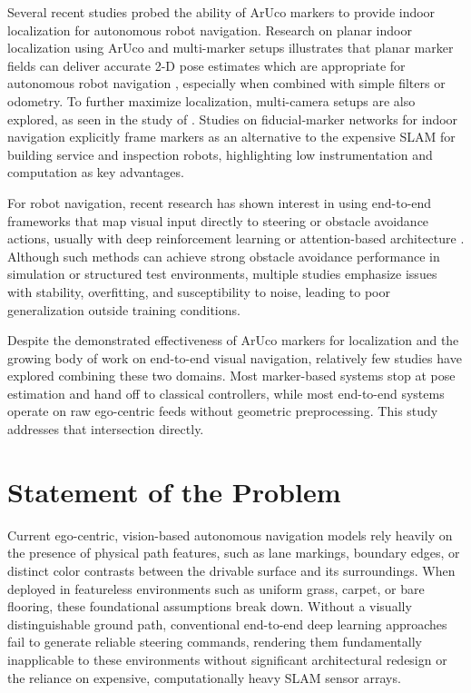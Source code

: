 Several recent studies probed the ability of ArUco markers to provide indoor localization for autonomous robot navigation. Research on planar indoor localization using ArUco \cite{Hinderer2025ArucoPlacementIndoor} and multi-marker setups illustrates that planar marker fields can deliver accurate 2-D pose estimates which are appropriate for autonomous robot navigation \cite{Lin2023MarkerBasedLocalization}, especially when combined with simple filters or odometry. To further maximize localization, multi-camera setups are also explored, as seen in the study of \cite{Sevgi2025MulticameraIndoorAruco}. Studies on fiducial‑marker networks for indoor navigation \cite{Braun2022RobotAtFactoryLocalization} explicitly frame markers as an alternative to the expensive SLAM for building service and inspection robots, highlighting low instrumentation and computation as key advantages.

For robot navigation, recent research has shown interest in using end-to-end frameworks that map visual input directly to steering \cite{Han2024NeuPAN} or obstacle avoidance actions, usually with deep reinforcement learning or attention-based architecture \cite{Zhou2025DRLSpatiotemporalTransformer, Yu2025RLAUVMotionSystems}. Although such methods can achieve strong obstacle avoidance performance in simulation or structured test environments, multiple studies emphasize issues with stability, overfitting, and susceptibility to noise, leading to poor generalization outside training conditions. 

Despite the demonstrated effectiveness of ArUco markers for localization and the growing body of work on end-to-end visual navigation, relatively few studies have explored combining these two domains. Most marker-based systems stop at pose estimation and hand off to classical controllers, while most end-to-end systems operate on raw ego-centric feeds without geometric preprocessing. This study addresses that intersection directly.

\section{Statement of the Problem} 
Current ego-centric, vision-based autonomous navigation models rely heavily on the presence of physical path features, such as lane markings, boundary edges, or distinct color contrasts between the drivable surface and its surroundings. When deployed in featureless environments such as uniform grass, carpet, or bare flooring, these foundational assumptions break down. Without a visually distinguishable ground path, conventional end-to-end deep learning approaches fail to generate reliable steering commands, rendering them fundamentally inapplicable to these environments without significant architectural redesign or the reliance on expensive, computationally heavy SLAM sensor arrays.

